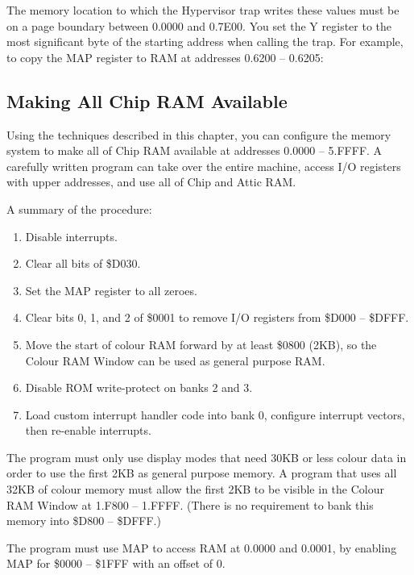 The memory location to which the Hypervisor trap writes these values must be
on a page boundary between 0.0000 and 0.7E00. You set the Y register to the
most significant byte of the starting address when calling the trap. For
example, to copy the MAP register to RAM at addresses 0.6200 -- 0.6205:


\subsection{Making All Chip RAM Available}

Using the techniques described in this chapter, you can configure the memory
system to make all of Chip RAM available at addresses 0.0000 -- 5.FFFF. A
carefully written program can take over the entire machine, access I/O
registers with upper addresses, and use all of Chip and Attic RAM.

A summary of the procedure:

\begin{enumerate}
\item Disable interrupts.
\item Clear all bits of \$D030.
\item Set the MAP register to all zeroes.
\item Clear bits 0, 1, and 2 of \$0001 to remove I/O registers from \$D000 -- \$DFFF.
\item Move the start of colour RAM forward by at least \$0800 (2KB), so the
Colour RAM Window can be used as general purpose RAM.
\item Disable ROM write-protect on banks 2 and 3.
\item Load custom interrupt handler code into bank 0, configure interrupt
vectors, then re-enable interrupts.
\end{enumerate}

The program must only use display modes that need 30KB or less colour data in
order to use the first 2KB as general purpose memory. A program that uses all
32KB of colour memory must allow the first 2KB to be visible in the Colour RAM
Window at 1.F800 -- 1.FFFF. (There is no requirement to bank this memory into
\$D800 -- \$DFFF.)

The program must use MAP to access RAM at 0.0000 and 0.0001, by enabling MAP
for \$0000 -- \$1FFF with an offset of 0.

